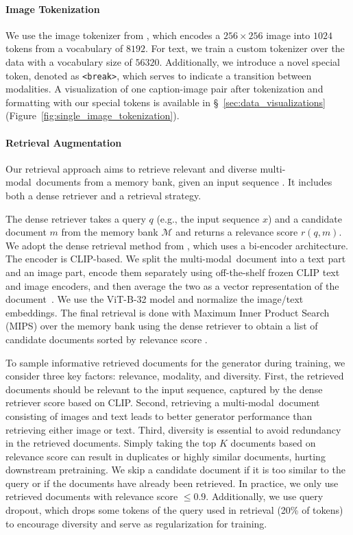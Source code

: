 \documentclass{article}
\newcommand{\mm}{multi-modal}
\begin{document}
\paragraph{Image Tokenization}
We use the image tokenizer from \citet{make_a_scene}, which encodes a $256\times256$ image into $1024$ tokens from a vocabulary of $8192$. For text, we train a custom tokenizer over the \citet{OPT} data with a vocabulary size of $56320$. Additionally, we introduce a novel special token, denoted as \texttt{<break>}, which serves to indicate a transition between modalities. A visualization of one caption-image pair after tokenization and formatting with our special tokens is available in \S~\ref{sec:data_visualizations}(Figure~\ref{fig:single_image_tokenization}).

\paragraph{Retrieval Augmentation}
Our retrieval approach aims to retrieve relevant and diverse \mm\ documents from a memory bank, given an input sequence \citep{RA_CM3}. It includes both a dense retriever and a retrieval strategy.

The dense retriever takes a query $q$ (e.g., the input sequence $x$) and a candidate document $m$ from the memory bank $\mathcal{M}$ and returns a relevance score $r(q, m)$. We adopt the dense retrieval method from \citet{dpr}, which uses a bi-encoder architecture. 
The encoder is CLIP-based. We split the \mm\ document into a text part and an image part, encode them separately using off-the-shelf frozen CLIP text and image encoders, and then average the two as a vector representation of the document~\citep{CLIP}. We use the ViT-B-32 model and normalize the image/text embeddings. 
The final retrieval is done with Maximum Inner Product Search (MIPS) over the memory bank using the dense retriever to obtain a list of candidate documents sorted by relevance score \citep{MIPS}.

To sample informative retrieved documents for the generator during training, we consider three key factors: relevance, modality, and diversity. First, the retrieved documents should be relevant to the input sequence, captured by the dense retriever score based on CLIP. Second, retrieving a \mm\ document consisting of images and text leads to better generator performance than retrieving either image or text. Third, diversity is essential to avoid redundancy in the retrieved documents. Simply taking the top $K$ documents based on relevance score can result in duplicates or highly similar documents, hurting downstream pretraining. We skip a candidate document if it is too similar to the query or if the documents have already been retrieved. In practice, we only use retrieved documents with relevance score $\leq 0.9$. Additionally, we use query dropout, which drops some tokens of the query used in retrieval (20\% of tokens) to encourage diversity and serve as regularization for training.
\end{document}
